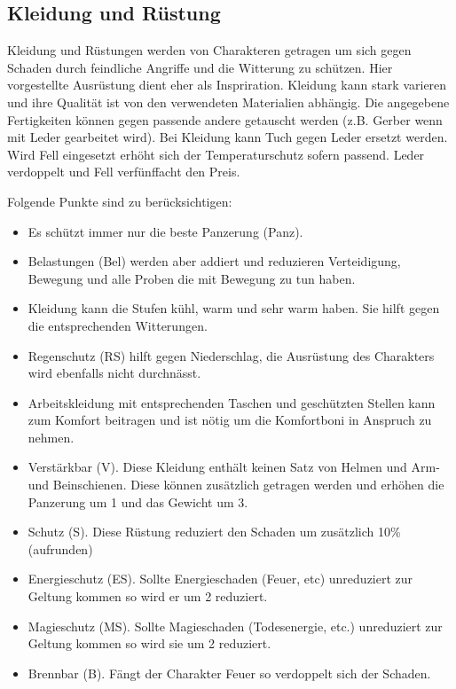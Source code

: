 \documentclass{article}
\begin{document}
\begin{center}
\subsection{Kleidung und Rüstung}
\end{center}

Kleidung und Rüstungen werden von Charakteren getragen um sich gegen Schaden durch feindliche Angriffe und die
Witterung zu schützen. Hier vorgestellte Ausrüstung dient eher als Inspriration. Kleidung kann stark varieren und
ihre Qualität ist von den verwendeten Materialien abhängig. Die angegebene Fertigkeiten können gegen passende andere
getauscht werden (z.B. Gerber wenn mit Leder gearbeitet wird).
Bei Kleidung kann Tuch gegen Leder ersetzt werden. Wird Fell eingesetzt erhöht sich der Temperaturschutz sofern
passend. Leder verdoppelt und Fell verfünffacht den Preis.

Folgende Punkte sind zu berücksichtigen:

\begin{itemize}
\item Es schützt immer nur die beste Panzerung (Panz).
\item Belastungen (Bel) werden aber addiert und reduzieren Verteidigung, Bewegung und alle Proben die mit Bewegung zu tun haben.
\item Kleidung kann die Stufen kühl, warm und sehr warm haben. Sie hilft gegen die entsprechenden Witterungen.
\item Regenschutz (RS) hilft gegen Niederschlag, die Ausrüstung des Charakters wird ebenfalls nicht durchnässt.
\item Arbeitskleidung mit entsprechenden Taschen und geschützten Stellen kann zum Komfort beitragen und ist nötig um die Komfortboni in Anspruch zu nehmen.
\item Verstärkbar (V). Diese Kleidung enthält keinen Satz von Helmen und Arm- und Beinschienen. Diese können zusätzlich getragen werden und erhöhen die Panzerung um 1 und das Gewicht um 3.
\item Schutz (S). Diese Rüstung reduziert den Schaden um zusätzlich 10\% (aufrunden)
\item Energieschutz (ES). Sollte Energieschaden (Feuer, etc) unreduziert zur Geltung kommen so wird er um 2 reduziert.
\item Magieschutz (MS). Sollte Magieschaden (Todesenergie, etc.) unreduziert zur Geltung kommen so wird sie um 2 reduziert.
\item Brennbar (B). Fängt der Charakter Feuer so verdoppelt sich der Schaden.
\end{itemize}
\end{document}
